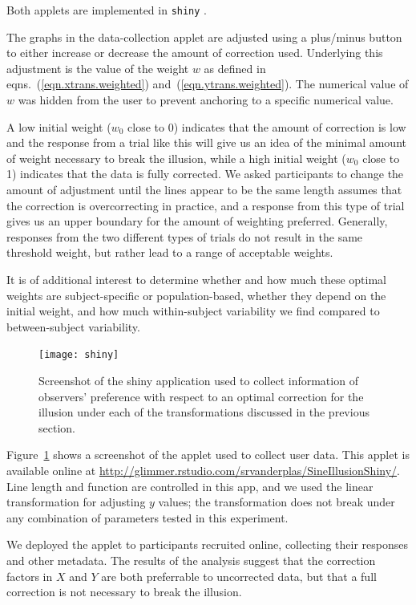 \documentclass[11pt]{isuthesis}\usepackage[]{graphicx}\usepackage[]{color}
\begin{document}
Both applets are implemented in {\tt shiny} \citep{shiny}. 

The graphs in the data-collection applet are adjusted using a plus/minus button to either increase or decrease the amount of correction used. Underlying this adjustment is the value of the weight $w$ as defined in eqns.~(\ref{eqn.xtrans.weighted}) and~(\ref{eqn.ytrans.weighted}). The numerical value of $w$ was hidden from the user to prevent anchoring to a specific numerical value.

A low  initial weight ($w_0$ close to 0) indicates that the amount of correction is low and the response from a trial like this will give us an idea of the minimal amount of weight necessary to break the illusion, while a high initial weight ($w_0$ close to 1) indicates that the data is fully corrected. We asked participants to change the amount of adjustment until the lines appear to be the same length assumes that the correction is overcorrecting in practice, and a response from this type of trial gives us an upper boundary for the amount of weighting preferred. Generally, responses from the two different types of trials do not result in the same threshold weight, but rather lead to a range of acceptable weights.

It is of additional interest to determine whether and how much these optimal weights are subject-specific or population-based, whether they depend on the initial weight, and how much within-subject variability we find compared to between-subject variability. 

\begin{figure}\centering
\texttt{[image: shiny]}
\caption[Screenshot of Data Collection Website]{\label{fig:shiny.app} Screenshot of the shiny application used to collect information of observers' preference with respect to an optimal correction for the illusion under each of the  transformations discussed in the previous section. }
\end{figure}

Figure~\ref{fig:shiny.app} shows a screenshot of the applet used to collect user data. This applet is  available online at \url{http://glimmer.rstudio.com/srvanderplas/SineIllusionShiny/}. 
Line length and function are controlled in this app, and we used the linear transformation for adjusting $y$ values; the transformation does not break under any combination of parameters tested in this experiment. 


\noindent
We deployed the applet to participants recruited online, collecting their responses and other metadata. The results of the analysis suggest that the correction factors in $X$ and $Y$ are both preferrable to uncorrected data, but that a full correction is not necessary to break the illusion.
\end{document}
